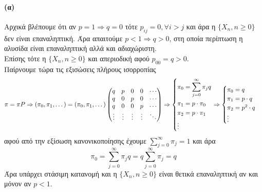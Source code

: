 \documentclass[a4paper,11pt]{article}
\begin{document}
\paragraph{(α)}
\begin{center}
\end{center}
Αρχικά βλέπουμε ότι αν $p=1 \Rightarrow q=0$ τότε $p_{ij} = 0, \forall i > j$ και άρα η $\{X_n,n\geq 0\}$ δεν είναι επαναληπτική.
Άρα απαιτούμε $p<1 \Rightarrow q>0$, στη οποία περίπτωση η αλυσίδα είναι επαναληπτική αλλά και αδιαχώριστη.
\\[8pt]
Επίσης τότε η $\{X_n,n\geq 0\}$ και απεριοδική αφού $p_{00} = q > 0$.
\\[8pt]
Παίρνουμε τώρα τις εξισώσεις πλήρους ισορροπίας
\[
	\pi = \pi P \Rightarrow (\pi_0,\pi_1,\dots) = (\pi_0,\pi_1,\dots)
		\begin{pmatrix}
			q & p & 0 & 0 & \cdots\\
			q & 0 & p & 0 & \cdots\\
			q & 0 & 0 & p & \cdots\\
			\vdots & \vdots & \vdots & \vdots & \ddots
		\end{pmatrix}
		\Rightarrow
			\begin{dcases}
				\pi_0 = \sum_{j=0}^\infty \pi_j q\\
				\pi_1 = p \cdot \pi_0\\
				\pi_2 = p \cdot \pi_1 \\
				\vdots
			\end{dcases}
		\Rightarrow
			\begin{cases}
				\pi_0 = q\\
				\pi_1 = p \cdot q\\
				\pi_2 = p^2 \cdot q \\
				\vdots
			\end{cases}
\]
αφού από την εξίσωση κανονικοποίησης έχουμε $\sum_{j=0}^\infty \pi_j = 1$ και άρα
\[\pi_0 = \sum_{j=0}^\infty \pi_j q = q \sum_{j=0}^\infty \pi_j = q\]
Άρα υπάρχει στάσιμη κατανομή και η $\{X_n,n\geq 0\}$ είναι θετικά επαναληπτική αν και μόνον αν $p<1$.
\end{document}
